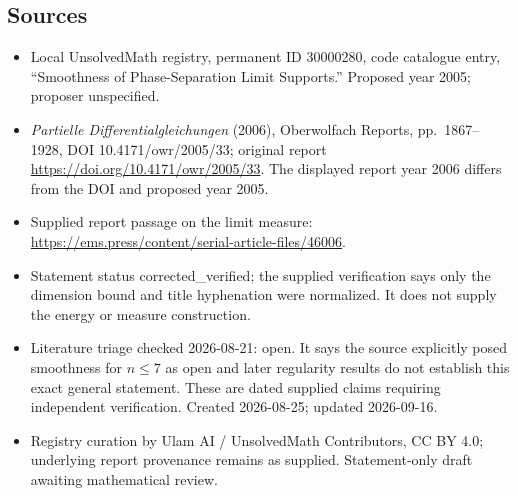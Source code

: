 \documentclass[11pt]{article}
\begin{document}
\subsection{Sources}
\begin{itemize}
\item Local UnsolvedMath registry, permanent ID 30000280, code catalogue entry, ``Smoothness of Phase-Separation Limit Supports.'' Proposed year 2005; proposer unspecified.
\item \emph{Partielle Differentialgleichungen} (2006), Oberwolfach Reports, pp.\ 1867--1928, DOI 10.4171/owr/2005/33; original report \url{https://doi.org/10.4171/owr/2005/33}. The displayed report year 2006 differs from the DOI and proposed year 2005.
\item Supplied report passage on the limit measure: \url{https://ems.press/content/serial-article-files/46006}.
\item Statement status corrected\_verified; the supplied verification says only the dimension bound and title hyphenation were normalized. It does not supply the energy or measure construction.
\item Literature triage checked 2026-08-21: open. It says the source explicitly posed smoothness for $n\le7$ as open and later regularity results do not establish this exact general statement. These are dated supplied claims requiring independent verification. Created 2026-08-25; updated 2026-09-16.
\item Registry curation by Ulam AI / UnsolvedMath Contributors, CC BY 4.0; underlying report provenance remains as supplied. Statement-only draft awaiting mathematical review.
\end{itemize}
\end{document}
